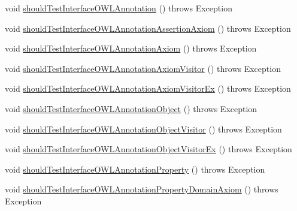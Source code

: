 \begin{DoxyCompactItemize}
\item 
void \hyperlink{classorg_1_1semanticweb_1_1owlapi_1_1contract_1_1_contract_owlapi_model__1_test_a9477cc62a56f342f9597d9a35d827685}{should\-Test\-Interface\-O\-W\-L\-Annotation} ()  throws Exception 
\item 
void \hyperlink{classorg_1_1semanticweb_1_1owlapi_1_1contract_1_1_contract_owlapi_model__1_test_a6a60142877d5eadc8757296b6e8c4607}{should\-Test\-Interface\-O\-W\-L\-Annotation\-Assertion\-Axiom} ()  throws Exception 
\item 
void \hyperlink{classorg_1_1semanticweb_1_1owlapi_1_1contract_1_1_contract_owlapi_model__1_test_ac2aff161b34929026b715b854a36365d}{should\-Test\-Interface\-O\-W\-L\-Annotation\-Axiom} ()  throws Exception 
\item 
void \hyperlink{classorg_1_1semanticweb_1_1owlapi_1_1contract_1_1_contract_owlapi_model__1_test_a50a138a8d96bfce9b40618944373ba89}{should\-Test\-Interface\-O\-W\-L\-Annotation\-Axiom\-Visitor} ()  throws Exception 
\item 
void \hyperlink{classorg_1_1semanticweb_1_1owlapi_1_1contract_1_1_contract_owlapi_model__1_test_a69da3febcd7f61d32c206461ebbc6495}{should\-Test\-Interface\-O\-W\-L\-Annotation\-Axiom\-Visitor\-Ex} ()  throws Exception 
\item 
void \hyperlink{classorg_1_1semanticweb_1_1owlapi_1_1contract_1_1_contract_owlapi_model__1_test_ae196e868868d907e8fbbeb3db47cecfc}{should\-Test\-Interface\-O\-W\-L\-Annotation\-Object} ()  throws Exception 
\item 
void \hyperlink{classorg_1_1semanticweb_1_1owlapi_1_1contract_1_1_contract_owlapi_model__1_test_af63bdff3a5265e29dfb95abd87be8485}{should\-Test\-Interface\-O\-W\-L\-Annotation\-Object\-Visitor} ()  throws Exception 
\item 
void \hyperlink{classorg_1_1semanticweb_1_1owlapi_1_1contract_1_1_contract_owlapi_model__1_test_a588697edba2b6d0e114748d14d144131}{should\-Test\-Interface\-O\-W\-L\-Annotation\-Object\-Visitor\-Ex} ()  throws Exception 
\item 
void \hyperlink{classorg_1_1semanticweb_1_1owlapi_1_1contract_1_1_contract_owlapi_model__1_test_a929d0f73da1ebe80d090fb8075fbcf1f}{should\-Test\-Interface\-O\-W\-L\-Annotation\-Property} ()  throws Exception 
\item 
void \hyperlink{classorg_1_1semanticweb_1_1owlapi_1_1contract_1_1_contract_owlapi_model__1_test_a69c11fa63ede759872b612cd26995796}{should\-Test\-Interface\-O\-W\-L\-Annotation\-Property\-Domain\-Axiom} ()  throws Exception 

\end{DoxyCompactItemize}
